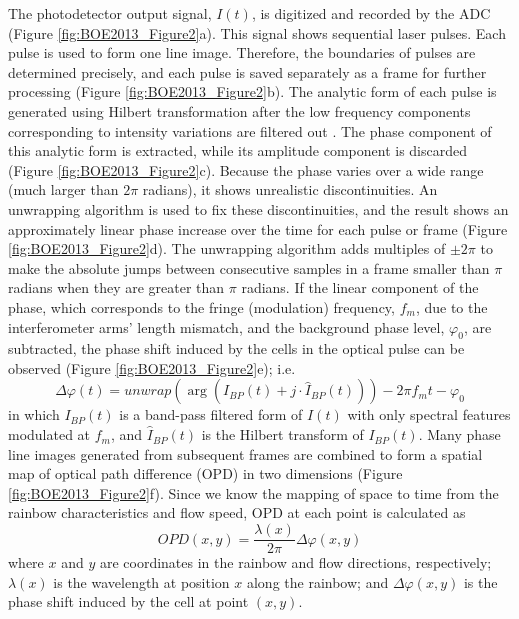 The photodetector output signal, $I(t)$, is digitized and recorded by the ADC (Figure \ref{fig:BOE2013_Figure2}a). This signal shows sequential laser pulses. Each pulse is used to form one line image. Therefore, the boundaries of pulses are determined precisely, and each pulse is saved separately as a frame for further processing (Figure \ref{fig:BOE2013_Figure2}b). The analytic form of each pulse is generated using Hilbert transformation after the low frequency components corresponding to intensity variations are filtered out \cite{ikeda2005hilbert}. The phase component of this analytic form is extracted, while its amplitude component is discarded (Figure \ref{fig:BOE2013_Figure2}c). Because the phase varies over a wide range (much larger than $2 \pi$ radians), it shows unrealistic discontinuities. An unwrapping algorithm is used to fix these discontinuities, and the result shows an approximately linear phase increase over the time for each pulse or frame (Figure \ref{fig:BOE2013_Figure2}d). The unwrapping algorithm adds multiples of $\pm 2 \pi$ to make the absolute jumps between consecutive samples in a frame smaller than $\pi$ radians when they are greater than $\pi$ radians. If the linear component of the phase, which corresponds to the fringe (modulation) frequency, $f_m$, due to the interferometer arms' length mismatch, and the background phase level, $\varphi_0$, are subtracted, the phase shift induced by the cells in the optical pulse can be observed (Figure \ref{fig:BOE2013_Figure2}e); i.e. 
\begin{equation}
\Delta\varphi(t)= unwrap(\arg(I_{BP}(t)+j \cdot \hat{I}_{BP}(t))) - 2 \pi f_m t - \varphi_0
\end{equation}
in which $I_{BP}(t)$ is a band-pass filtered form of $I(t)$ with only spectral features modulated at $f_m$, and $\hat{I}_{BP}(t)$ is the Hilbert transform of $I_{BP}(t)$. Many phase line images generated from subsequent frames are combined to form a spatial map of optical path difference (OPD) in two dimensions (Figure \ref{fig:BOE2013_Figure2}f). Since we know the mapping of space to time from the rainbow characteristics and flow speed, OPD at each point is calculated as
\begin{equation}
OPD(x,y) = \frac{\lambda(x)}{2 \pi} \Delta\varphi(x,y)
\end{equation}
where $x$ and $y$ are coordinates in the rainbow and flow directions, respectively; $\lambda(x)$ is the wavelength at position $x$ along the rainbow; and $\Delta\varphi(x,y)$ is the phase shift induced by the cell at point $(x,y)$.

